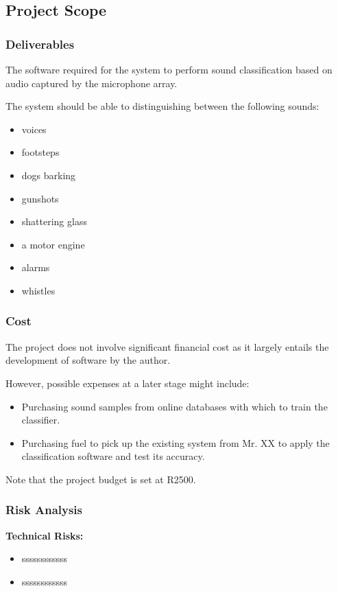 \documentclass[a4paper,12pt]{article}
\numberwithin{equation}{section}
\numberwithin{figure}{section}
\numberwithin{table}{section}
\begin{document}
\subsection{Project Scope}

\subsubsection{Deliverables}
The software required for the system to perform sound classification based on audio captured by the microphone array.

The system should be able to distinguishing between the following sounds:
\begin{itemize}
    \item voices
    \item footsteps
    \item dogs barking
    \item gunshots
    \item shattering glass
    \item a motor engine
    \item alarms
    \item whistles
\end{itemize}

\subsubsection{Cost} %
The project does not involve significant financial cost as it largely entails the development of software by the author.

However, possible expenses at a later stage might include:
\begin{itemize}
    \item Purchasing sound samples from online databases with which to train the classifier.
    \item Purchasing fuel to pick up the existing system from Mr. XX to apply the classification software and test its accuracy.
\end{itemize}

Note that the project budget is set at R2500.

\subsubsection{Risk Analysis} %
\textbf{Technical Risks:}
\begin{itemize}
    \item ssssssssssss
    \item ssssssssssss
\end{itemize}
\end{document}
